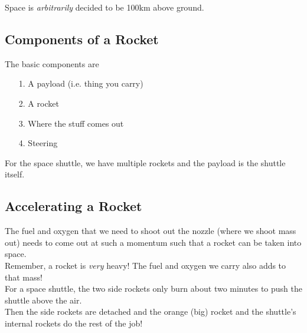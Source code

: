 \documentclass[12pt]{article}
\theoremstyle{definition}
\begin{document}
Space is \emph{arbitrarily} decided to be 100km above ground. \\

\subsection{Components of a Rocket}
The basic components are
\begin{enumerate}
  \item[1.] A payload (i.e. thing you carry)

  \item[2.] A rocket

  \item[3.] Where the stuff comes out

  \item[4.] Steering
\end{enumerate}

For the space shuttle, we have multiple rockets and the payload is the shuttle itself.

\subsection{Accelerating a Rocket}
The fuel and oxygen that we need to shoot out the nozzle (where we shoot mass out) needs to come out at such a momentum such that a rocket can be taken into space. \\
Remember, a rocket is \emph{very} heavy! The fuel and oxygen we carry also adds to that mass! \\

For a space shuttle, the two side rockets only burn about two minutes to push the shuttle above the air. \\
Then the side rockets are detached and the orange (big) rocket and the shuttle's internal rockets do the rest of the job! \\
\end{document}
